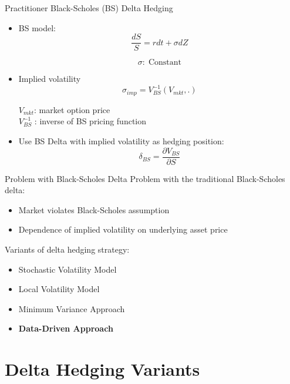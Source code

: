 \documentclass[10pt,table,mathserif]{beamer}
\begin{document}
\begin{frame}{Practitioner Black-Scholes (BS) Delta Hedging}
\begin{itemize}
  \item BS model:
\[
\frac{d S}{ S}= r dt +\sigma dZ
\]

\[
\sigma:\; \text{Constant}
\]
\item Implied volatility
  \[
  \sigma_{imp}=V_{BS}^{-1}(V_{mkt},.)
  \]
  \begin{center}
  $V_{mkt}$: market option price \\ $V_{BS}^{-1}$ : inverse of BS pricing function
  \end{center}

\item Use BS Delta with implied volatility as hedging position:
\[
\delta_{BS}=\frac{\partial V_{BS}}{ \partial S}
\]
\end{itemize}
\end{frame}






\begin{frame}{Problem with Black-Scholes Delta}
Problem with the traditional Black-Scholes delta:
\begin{itemize}
  \item Market violates Black-Scholes assumption
  \item Dependence of implied volatility on underlying asset price
\end{itemize}
Variants of delta hedging strategy:
\begin{itemize}
  \item Stochastic Volatility Model
  \item Local Volatility Model
  \item Minimum Variance Approach
  \item \textbf{Data-Driven Approach}
\end{itemize}
\end{frame}
\section{Delta Hedging Variants}
\end{document}
